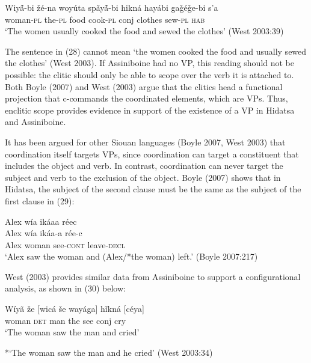 \documentclass[output=paper]{LSP/langsci}
\begin{document}
\begin{exe}
\ex \gll Wiy\'{\~a}-bi 		\v{z}\'e-na 	woy\'uta 	sp\~ay\'{\~a}-bi 	hikn\'a 	hay\'abi 		ga\v{g}\'e\v{g}e-bi 	s'a \\
woman-\textsc{pl} the-\textsc{pl} 	food 	cook-\textsc{pl} 	conj 	clothes 	sew-\textsc{pl} 	\textsc{hab} \\
\trans `The women usually cooked the food and sewed the clothes' (West 2003:39)
\end{exe}

The sentence in (28) cannot mean `the women cooked the food and usually sewed the clothes' (West 2003).  If Assiniboine had no VP, this reading should not be possible: the clitic should only be able to scope over the verb it is attached to. Both Boyle (2007) and West (2003) argue that the clitics head a functional projection that c-commands the coordinated elements, which are VPs.  Thus, enclitic scope provides evidence in support of the existence of a VP in Hidatsa and Assiniboine.
	
It has been argued for other Siouan languages (Boyle 2007, West 2003) that coordination itself targets VPs, since coordination can target a constituent that includes the object and verb. In contrast, coordination can never target the subject and verb to the exclusion of the object.  Boyle (2007) shows that in Hidatsa, the subject of the second clause must be the same as the subject of the first clause in (29):

\begin{exe}
\ex 
\glll Alex w\'ia ik\'aaa r\'eec\\
Alex w\'ia ik\'aa-a r\'ee-c \\
Alex woman see-\textsc{cont} leave-\textsc{decl} \\
\trans `Alex saw the woman and (Alex/*the woman) left.' (Boyle 2007:217) 
\end{exe}

West (2003) provides similar data from Assiniboine to support a configurational analysis, as shown in (30) below:

\begin{exe}
\ex \gll W\'iy\~a 	 \v{z}e 		[wic\'a 	\v{s}e 	way\'aga] h\~ikn\'a 	[c\'eya] \\
woman 	\textsc{det} 	man 		the see 				conj 		cry \\
\trans `The woman saw the man and cried'

*`The woman saw the man and he cried' (West 2003:34)
\end{exe}
\end{document}
